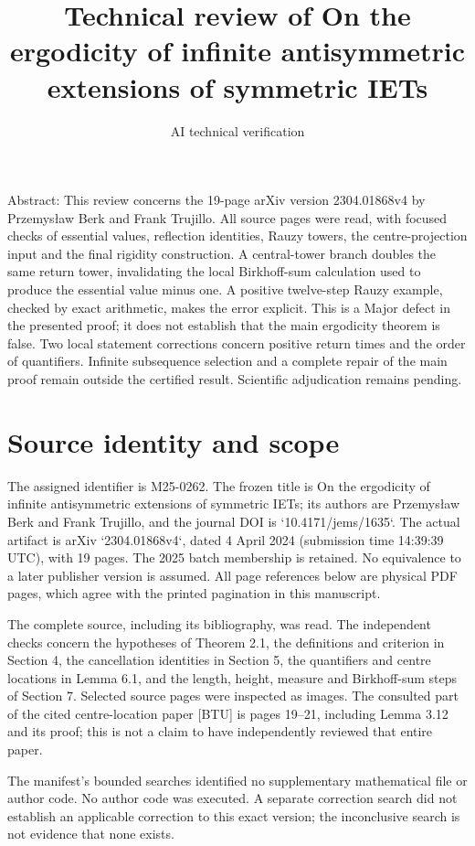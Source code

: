 \documentclass[10pt]{article}
\title{Technical review of
On the ergodicity of infinite antisymmetric extensions of symmetric IETs}
\author{AI technical verification}
\date{}
\begin{document}
\maketitle
Abstract: This review concerns the 19-page arXiv version 2304.01868v4 by Przemysław Berk and Frank Trujillo. All source pages were read, with focused checks of essential values, reflection identities, Rauzy towers, the centre-projection input and the final rigidity construction. A central-tower branch doubles the same return tower, invalidating the local Birkhoff-sum calculation used to produce the essential value minus one. A positive twelve-step Rauzy example, checked by exact arithmetic, makes the error explicit. This is a Major defect in the presented proof; it does not establish that the main ergodicity theorem is false. Two local statement corrections concern positive return times and the order of quantifiers. Infinite subsequence selection and a complete repair of the main proof remain outside the certified result. Scientific adjudication remains pending.\par
\section*{Source identity and scope}
The assigned identifier is M25-0262. The frozen title is On the ergodicity of infinite antisymmetric extensions of symmetric IETs; its authors are Przemysław Berk and Frank Trujillo, and the journal DOI is `10.4171/jems/1635`. The actual artifact is arXiv `2304.01868v4`, dated 4 April 2024 (submission time 14:39:39 UTC), with 19 pages. The 2025 batch membership is retained. No equivalence to a later publisher version is assumed. All page references below are physical PDF pages, which agree with the printed pagination in this manuscript.\par
The complete source, including its bibliography, was read. The independent checks concern the hypotheses of Theorem 2.1, the definitions and criterion in Section 4, the cancellation identities in Section 5, the quantifiers and centre locations in Lemma 6.1, and the length, height, measure and Birkhoff-sum steps of Section 7. Selected source pages were inspected as images. The consulted part of the cited centre-location paper [BTU] is pages 19–21, including Lemma 3.12 and its proof; this is not a claim to have independently reviewed that entire paper.\par
The manifest’s bounded searches identified no supplementary mathematical file or author code. No author code was executed. A separate correction search did not establish an applicable correction to this exact version; the inconclusive search is not evidence that none exists.\par
\end{document}
